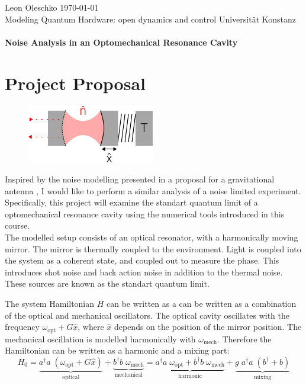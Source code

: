 \documentclass[
	a4page,
	parskip=full,
]{scrartcl}
\begin{document}
{
	\sffamily\noindent
	Leon Oleschko \hfill \today\\
	Modeling Quantum Hardware: open dynamics and control \hfill Universität Konstanz\\
	\vspace*{1cm}\\
	\textbf{\Large Noise Analysis in an Optomechanical Resonance Cavity}
}

\section*{Project Proposal}
\begin{figure}
	\includegraphics{figures/drawing.pdf}
\end{figure}
Inspired by the noise modelling presented in a proposal for a gravitational antenna \autocite{rainer_weiss_electronically_1972},
I would like to perform a similar analysis of a noise limited experiment.
Specifically, this project will examine the standart quantum limit of a optomechanical resonance cavity using the numerical tools introduced in this course.\\
The modelled setup consists of an optical resonator, with a harmonically moving mirror.
The mirror is thermally coupled to the environment.
Light is coupled into the system as a coherent state, and coupled out to measure the phase.
This introduces shot noise and back action noise in addition to the thermal noise.
These sources are known as the standart quantum limit.

The system Hamiltonian $H$ can be written as a can be written as a combination of the optical and mechanical oscillators.
The optical cavity oscillates with the frequency $\omega_\text{opt} + G \hat x$, where $\hat x$ depends on the position of the mirror position.
The mechanical oscillation is modelled harmonically with $\omega_\text{mech}$.
Therefore the Hamiltonian can be written as a harmonic and a mixing part:
$$
	H_0 = \underbrace{
		a^\dagger a\; (\omega_\text{opt} + G \hat x)
	}_{\text{optical}}+ \underbrace{
		b^\dagger b\; \omega_\text{mech}
	}_{\text{mechanical}}
	= 
	\underbrace{
			a^\dagger a\; \omega_\text{opt}
		+ b^\dagger b\; \omega_\text{mech}
	}_{\text{harmonic}}
	+ 
	\underbrace{
		g\; a^\dagger a\; (b^\dagger + b)
	}_{\text{mixing}}
$$ 
\end{document}
